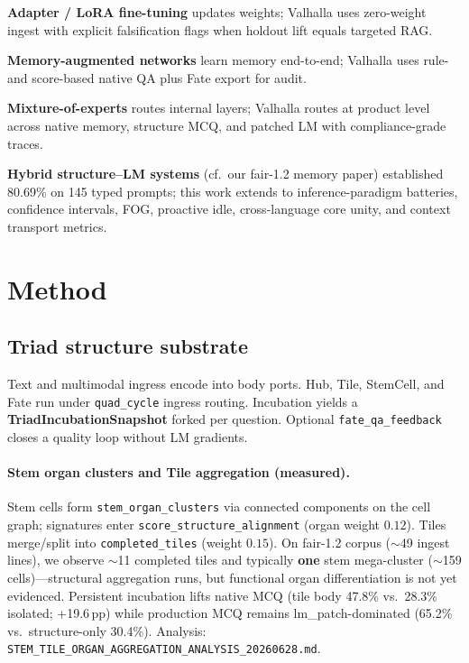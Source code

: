 \documentclass[11pt,a4paper]{article}
\begin{document}
\textbf{Adapter / LoRA fine-tuning} updates weights; Valhalla uses zero-weight ingest with explicit falsification flags when holdout lift equals targeted RAG.

\textbf{Memory-augmented networks} learn memory end-to-end; Valhalla uses rule- and score-based native QA plus Fate export for audit.

\textbf{Mixture-of-experts} routes internal layers; Valhalla routes at product level across native memory, structure MCQ, and patched LM with compliance-grade traces.

\textbf{Hybrid structure--LM systems} (cf.\ our fair-1.2 memory paper) established 80.69\% on 145 typed prompts; this work extends to inference-paradigm batteries, confidence intervals, FOG, proactive idle, cross-language core unity, and context transport metrics.

\section{Method}

\subsection{Triad structure substrate}

Text and multimodal ingress encode into body ports. Hub, Tile, StemCell, and Fate run under \texttt{quad\_cycle} ingress routing. Incubation yields a \textbf{TriadIncubationSnapshot} forked per question. Optional \texttt{fate\_qa\_feedback} closes a quality loop without LM gradients.

\paragraph{Stem organ clusters and Tile aggregation (measured).}
Stem cells form \texttt{stem\_organ\_clusters} via connected components on the cell graph; signatures enter \texttt{score\_structure\_alignment} (organ weight $0.12$). Tiles merge/split into \texttt{completed\_tiles} (weight $0.15$). On fair-1.2 corpus ($\sim$49 ingest lines), we observe $\sim$11 completed tiles and typically \textbf{one} stem mega-cluster ($\sim$159 cells)---structural aggregation runs, but functional organ differentiation is not yet evidenced. Persistent incubation lifts native MCQ (tile body 47.8\% vs.\ 28.3\% isolated; +19.6\,pp) while production MCQ remains lm\_patch-dominated (65.2\% vs.\ structure-only 30.4\%). Analysis: \texttt{STEM\_TILE\_ORGAN\_AGGREGATION\_ANALYSIS\_20260628.md}.
\end{document}
